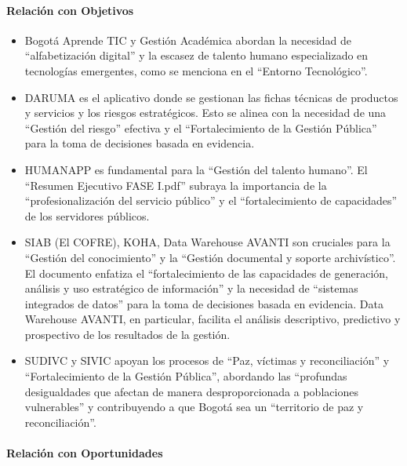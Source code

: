 \documentclass[
	a4paper, %
	12pt, %
]{include/CSSullivanBusinessReport}
\def\tightlist{}
\begin{document}
\paragraph{Relación con Objetivos}\label{sec:relaciuxf3n-con-objetivos}

\begin{itemize}
\tightlist
\item
  Bogotá Aprende TIC y Gestión Académica abordan la necesidad de
  ``alfabetización digital'' y la escasez de talento humano
  especializado en tecnologías emergentes, como se menciona en el
  ``Entorno Tecnológico''.
\item
  DARUMA es el aplicativo donde se gestionan las fichas técnicas de
  productos y servicios y los riesgos estratégicos. Esto se alinea con
  la necesidad de una ``Gestión del riesgo'' efectiva y el
  ``Fortalecimiento de la Gestión Pública'' para la toma de decisiones
  basada en evidencia.
\item
  HUMANAPP es fundamental para la ``Gestión del talento humano''. El
  ``Resumen Ejecutivo FASE I.pdf'' subraya la importancia de la
  ``profesionalización del servicio público'' y el ``fortalecimiento de
  capacidades'' de los servidores públicos.
\item
  SIAB (El COFRE), KOHA, Data Warehouse AVANTI son cruciales para la
  ``Gestión del conocimiento'' y la ``Gestión documental y soporte
  archivístico''. El documento enfatiza el ``fortalecimiento de las
  capacidades de generación, análisis y uso estratégico de información''
  y la necesidad de ``sistemas integrados de datos'' para la toma de
  decisiones basada en evidencia. Data Warehouse AVANTI, en particular,
  facilita el análisis descriptivo, predictivo y prospectivo de los
  resultados de la gestión.
\item
  SUDIVC y SIVIC apoyan los procesos de ``Paz, víctimas y
  reconciliación'' y ``Fortalecimiento de la Gestión Pública'',
  abordando las ``profundas desigualdades que afectan de manera
  desproporcionada a poblaciones vulnerables'' y contribuyendo a que
  Bogotá sea un ``territorio de paz y reconciliación''.
\end{itemize}

\paragraph{Relación con
Oportunidades}\label{sec:relaciuxf3n-con-oportunidades}
\end{document}
